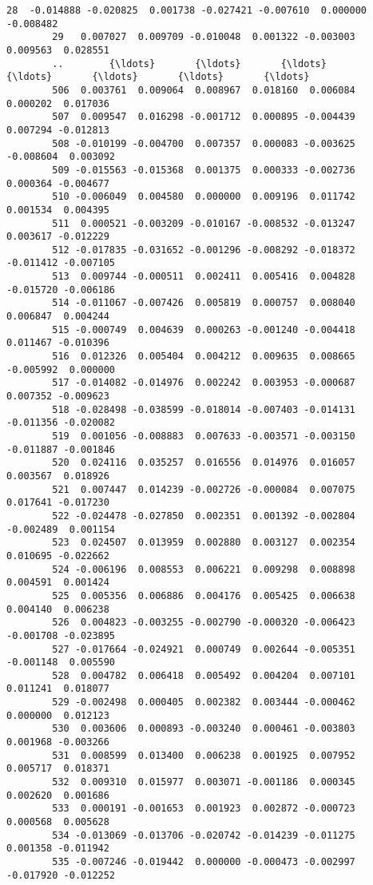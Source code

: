\documentclass[11pt]{article}
\begin{document}
\begin{Verbatim}[commandchars=\\\{\}]
        28  -0.014888 -0.020825  0.001738 -0.027421 -0.007610  0.000000 -0.008482   
        29   0.007027  0.009709 -0.010048  0.001322 -0.003003  0.009563  0.028551   
        ..        {\ldots}       {\ldots}       {\ldots}       {\ldots}       {\ldots}       {\ldots}       {\ldots}   
        506  0.003761  0.009064  0.008967  0.018160  0.006084  0.000202  0.017036   
        507  0.009547  0.016298 -0.001712  0.000895 -0.004439  0.007294 -0.012813   
        508 -0.010199 -0.004700  0.007357  0.000083 -0.003625 -0.008604  0.003092   
        509 -0.015563 -0.015368  0.001375  0.000333 -0.002736  0.000364 -0.004677   
        510 -0.006049  0.004580  0.000000  0.009196  0.011742  0.001534  0.004395   
        511  0.000521 -0.003209 -0.010167 -0.008532 -0.013247  0.003617 -0.012229   
        512 -0.017835 -0.031652 -0.001296 -0.008292 -0.018372 -0.011412 -0.007105   
        513  0.009744 -0.000511  0.002411  0.005416  0.004828 -0.015720 -0.006186   
        514 -0.011067 -0.007426  0.005819  0.000757  0.008040  0.006847  0.004244   
        515 -0.000749  0.004639  0.000263 -0.001240 -0.004418  0.011467 -0.010396   
        516  0.012326  0.005404  0.004212  0.009635  0.008665 -0.005992  0.000000   
        517 -0.014082 -0.014976  0.002242  0.003953 -0.000687  0.007352 -0.009623   
        518 -0.028498 -0.038599 -0.018014 -0.007403 -0.014131 -0.011356 -0.020082   
        519  0.001056 -0.008883  0.007633 -0.003571 -0.003150 -0.011887 -0.001846   
        520  0.024116  0.035257  0.016556  0.014976  0.016057  0.003567  0.018926   
        521  0.007447  0.014239 -0.002726 -0.000084  0.007075  0.017641 -0.017230   
        522 -0.024478 -0.027850  0.002351  0.001392 -0.002804 -0.002489  0.001154   
        523  0.024507  0.013959  0.002880  0.003127  0.002354  0.010695 -0.022662   
        524 -0.006196  0.008553  0.006221  0.009298  0.008898  0.004591  0.001424   
        525  0.005356  0.006886  0.004176  0.005425  0.006638  0.004140  0.006238   
        526  0.004823 -0.003255 -0.002790 -0.000320 -0.006423 -0.001708 -0.023895   
        527 -0.017664 -0.024921  0.000749  0.002644 -0.005351 -0.001148  0.005590   
        528  0.004782  0.006418  0.005492  0.004204  0.007101  0.011241  0.018077   
        529 -0.002498  0.000405  0.002382  0.003444 -0.000462  0.000000  0.012123   
        530  0.003606  0.000893 -0.003240  0.000461 -0.003803  0.001968 -0.003266   
        531  0.008599  0.013400  0.006238  0.001925  0.007952  0.005717  0.018371   
        532  0.009310  0.015977  0.003071 -0.001186  0.000345  0.002620  0.001686   
        533  0.000191 -0.001653  0.001923  0.002872 -0.000723  0.000568  0.005628   
        534 -0.013069 -0.013706 -0.020742 -0.014239 -0.011275  0.001358 -0.011942   
        535 -0.007246 -0.019442  0.000000 -0.000473 -0.002997 -0.017920 -0.012252   
        

\end{Verbatim}
\end{document}
